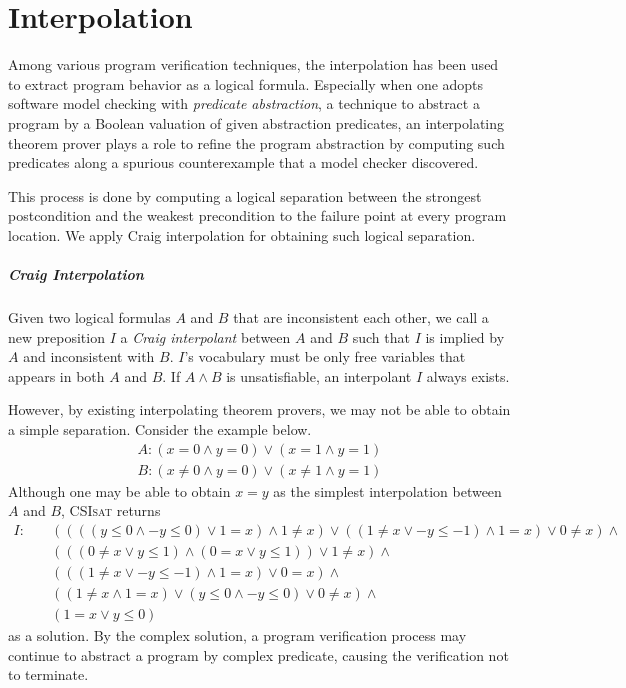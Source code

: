 \chapter{Interpolation}
\label{chap:interpolation}

Among various program verification techniques, the interpolation has
been used to extract program behavior as a logical formula.
Especially when one adopts software model checking with
\emph{predicate abstraction}, a technique to abstract a program by a
Boolean valuation of given abstraction predicates, an interpolating
theorem prover plays a role to refine the program abstraction by
computing such predicates along a spurious counterexample that a model
checker discovered.

This process is done by computing a logical separation between the
strongest postcondition and the weakest precondition to the failure
point at every program location.  We apply Craig interpolation for
obtaining such logical separation.

\paragraph{Craig Interpolation}
Given two logical formulas $A$ and $B$ that are inconsistent each
other, we call a new preposition $I$ a \emph{Craig interpolant}
\cite{journals/jsyml/Craig57} between $A$ and $B$ such that $I$ is
implied by $A$ and inconsistent with $B$.  $I$'s vocabulary must be
only free variables that appears in both $A$ and $B$.  If $A \wedge B$
is unsatisfiable, an interpolant $I$ always exists.
\vspace{10pt}

However, by existing interpolating theorem provers, we may not be able
to obtain a simple separation.  Consider the example below.
\begin{align*}
A : (x = 0 \wedge y = 0) \vee (x = 1 \wedge y = 1) \\
B : (x \neq 0 \wedge y = 0) \vee (x \neq 1 \wedge y = 1)
\end{align*}
Although one may be able to obtain $x = y$ as the simplest
interpolation between $A$ and $B$,
\textsc{CSIsat}\cite{conf/cav/BeyerZM08} returns
\begin{align*}
I: \quad & ((((y \leq 0 \wedge -y \leq 0) \vee 1 = x) \wedge 1 \neq x) \vee ((1 \neq x \vee -y \leq -1) \wedge 1 = x) \vee 0 \neq x) \wedge \\
& (((0 \neq x \vee y \leq 1) \wedge (0 = x \vee y \leq 1)) \vee 1 \neq x) \wedge \\
& (((1 \neq x \vee -y \leq -1) \wedge 1 = x) \vee 0 = x) \wedge \\
& ((1 \neq x \wedge 1 = x) \vee (y \leq 0 \wedge -y \leq 0) \vee 0 \neq x) \wedge \\
& (1 = x \vee y \leq 0)
\end{align*}
as a solution.  By the complex solution, a program verification
process may continue to abstract a program by complex predicate,
causing the verification not to terminate.

